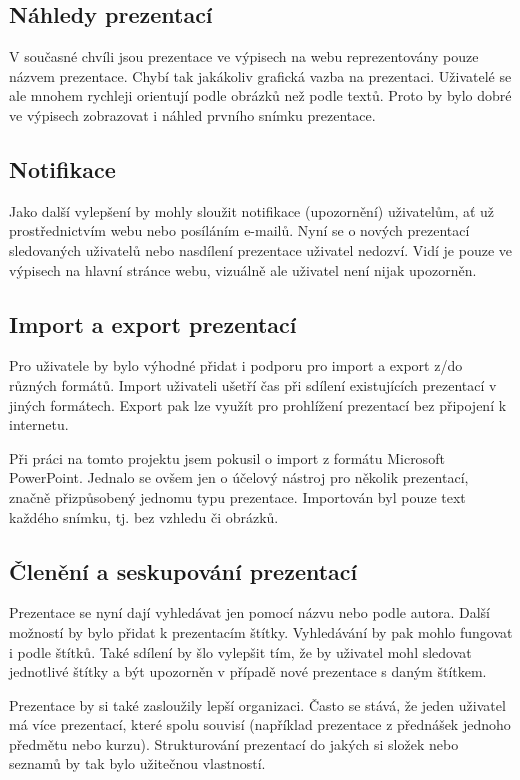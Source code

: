 \documentclass[11pt,twoside,a4paper]{book}
\begin{document}
\subsection{Náhledy prezentací}
V současné chvíli jsou prezentace ve výpisech na webu reprezentovány pouze názvem prezentace. Chybí tak jakákoliv grafická vazba na prezentaci. Uživatelé se ale mnohem rychleji orientují podle obrázků než podle textů. Proto by bylo dobré ve výpisech zobrazovat i náhled prvního snímku prezentace.

\subsection{Notifikace}
Jako další vylepšení by mohly sloužit notifikace (upozornění) uživatelům, ať už prostřednictvím webu nebo posíláním e-mailů. Nyní se o nových prezentací sledovaných uživatelů nebo nasdílení prezentace uživatel nedozví. Vidí je pouze ve výpisech na hlavní stránce webu, vizuálně ale uživatel není nijak upozorněn.

\subsection{Import a export prezentací}
Pro uživatele by bylo výhodné přidat i podporu pro import a export z/do různých formátů. Import uživateli ušetří čas při sdílení existujících prezentací v jiných formátech. Export pak lze využít pro prohlížení prezentací bez připojení k internetu.

Při práci na tomto projektu jsem pokusil o import z formátu Microsoft PowerPoint. Jednalo se ovšem jen o účelový nástroj pro několik prezentací, značně přizpůsobený jednomu typu prezentace. Importován byl pouze text každého snímku, tj. bez vzhledu či obrázků.

\subsection{Členění a seskupování prezentací}
Prezentace se nyní dají vyhledávat jen pomocí názvu nebo podle autora. Další možností by bylo přidat k prezentacím štítky. Vyhledávání by pak mohlo fungovat i podle štítků. Také sdílení by šlo vylepšit tím, že by uživatel mohl sledovat jednotlivé štítky a být upozorněn v případě nové prezentace s daným štítkem.

Prezentace by si také zasloužily lepší organizaci. Často se stává, že jeden uživatel má více prezentací, které spolu souvisí (například prezentace z přednášek jednoho předmětu nebo kurzu). Strukturování prezentací do jakých si složek nebo seznamů by tak bylo užitečnou vlastností.
\end{document}
